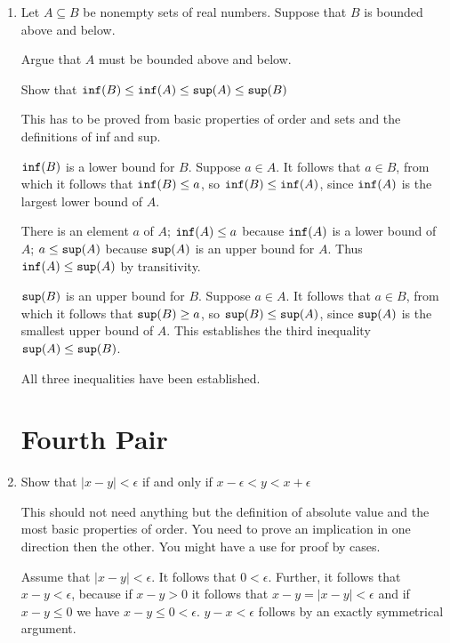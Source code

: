 \documentclass[12pt]{article}
\begin{document}
\begin{enumerate}
\newpage

\item 

Let $A \subseteq B$ be nonempty sets of real numbers.  Suppose that $B$ is bounded above and below.  

Argue that $A$ must be bounded above and below.

Show that ${\tt inf}(B) \leq {\tt inf}(A) \leq {\tt sup}(A) \leq {\tt sup}(B)$

This has to be proved from basic properties of order and sets and the definitions of inf and sup.

${\tt inf}(B)$ is a lower bound for $B$.  Suppose $a \in A$.  It follows that $a \in B$, from which it follows that ${\tt inf}(B)\leq a$, so ${\tt inf}(B) \leq {\tt inf}(A)$, since ${\tt inf}(A)$ is the largest lower bound of $A$.

There is an element $a$ of $A$;  ${\tt inf}(A)\leq a$ because ${\tt inf}(A)$ is a lower bound of $A$; $a \leq {\tt sup}(A)$ because ${\tt sup}(A)$ is an upper bound for $A$.  Thus ${\tt inf}(A) \leq {\tt sup}(A)$ by transitivity.

${\tt sup}(B)$ is an upper bound for $B$.  Suppose $a \in A$.  It follows that $a \in B$, from which it follows that ${\tt sup}(B)\geq a$, so ${\tt sup}(B) \leq {\tt sup}(A)$, since ${\tt sup}(A)$ is the smallest upper bound of $A$.  This establishes the third inequality ${\tt sup}(A) \leq {\tt sup}(B)$.

All three inequalities have  been established.

\newpage

\section{Fourth Pair}

\item  Show that $|x-y|<\epsilon$ if and only if $x-\epsilon < y < x+\epsilon$

This should not need anything but the definition of absolute value and the most basic properties of order.  You need to prove an implication in one direction then the other.  You might have a use for proof by cases.

Assume that $|x-y|<\epsilon$.  It follows that $0<\epsilon$.  Further, it follows that $x-y < \epsilon$, because if $x-y >0$ it follows that
$x-y = |x-y| < \epsilon$ and if $x-y \leq 0$ we have $x-y \leq 0 <\epsilon$.  $y-x <\epsilon$ follows by an exactly symmetrical argument.


\end{enumerate}
\end{document}
